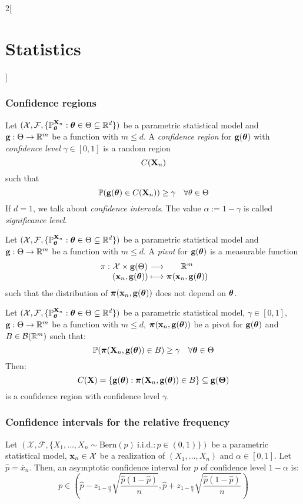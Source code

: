 \documentclass[../../../main.tex]{subfiles}
\begin{document}
\begin{multicols}{2}[\section{Statistics}]
  \subsubsection{Confidence regions}
  \begin{definition}
    Let $(\mathcal{X},\mathcal{F},\{\mathbb{P}_{\boldsymbol{\mathrm{\theta}}}^{\boldsymbol{\mathrm{X}}_n}:\boldsymbol{\mathrm{\theta}}\in\Theta\subseteq\mathbb{R}^d\})$ be a parametric statistical model and $\boldsymbol{\mathrm{g}}:\Theta\rightarrow\mathbb{R}^m$ be a function with $m\leq d$. A \emph{confidence region} for $\boldsymbol{\mathrm{g}}(\boldsymbol{\mathrm{\theta}})$ with \emph{confidence level} $\gamma\in[0,1]$ is a random region $$C(\boldsymbol{\mathrm{X}}_n)$$ such that $$\mathbb{P}(\boldsymbol{\mathrm{g}}(\boldsymbol{\mathrm{\theta}})\in C(\boldsymbol{\mathrm{X}}_n))\geq \gamma\quad\forall \theta\in\Theta$$ If $d=1$, we talk about \emph{confidence intervals}. The value $\alpha:=1-\gamma$ is called \emph{significance level}.
  \end{definition}
  \begin{definition}
    Let $(\mathcal{X},\mathcal{F},\{\mathbb{P}_{\boldsymbol{\mathrm{\theta}}}^{\boldsymbol{\mathrm{X}}_n}:\boldsymbol{\mathrm{\theta}}\in\Theta\subseteq\mathbb{R}^d\})$ be a parametric statistical model and $\boldsymbol{\mathrm{g}}:\Theta\rightarrow\mathbb{R}^m$ be a function with $m\leq d$. A \emph{pivot} for $\boldsymbol{\mathrm{g}}(\boldsymbol{\mathrm{\theta}})$ is a measurable function
    $$\function{\pi}{\mathcal{X}\times \vf{g}(\Theta)}{\RR^m}{(\vf{x}_n,\vf{g}(\vf\theta))}{\vf\pi(\vf{x}_n,\vf{g}(\vf\theta))}$$
    such that the distribution of $\boldsymbol{\mathrm{\pi}}(\boldsymbol{\mathrm{x}}_n,\boldsymbol{\mathrm{g}}(\boldsymbol{\mathrm{\theta}}))$ does not depend on $\boldsymbol{\mathrm{\theta}}$.
  \end{definition}
  \begin{proposition}
    Let $(\mathcal{X},\mathcal{F},\{\mathbb{P}_{\boldsymbol{\mathrm{\theta}}}^{\boldsymbol{\mathrm{X}}_n}:\boldsymbol{\mathrm{\theta}}\in\Theta\subseteq\mathbb{R}^d\})$ be a parametric statistical model, $\gamma\in[0,1]$, $\boldsymbol{\mathrm{g}}:\Theta\rightarrow\mathbb{R}^m$ be a function with $m\leq d$, $\boldsymbol{\mathrm{\pi}}(\boldsymbol{\mathrm{x}}_n,\boldsymbol{\mathrm{g}}(\boldsymbol{\mathrm{\theta}}))$ be a pivot for $\boldsymbol{\mathrm{g}}(\boldsymbol{\mathrm{\theta}})$ and $B\in\mathcal{B}(\mathbb{R}^m)$ such that: $$\mathbb{P}(\boldsymbol{\mathrm{\pi}}(\boldsymbol{\mathrm{X}}_n,\boldsymbol{\mathrm{g}}(\boldsymbol{\mathrm{\theta}}))\in B)\geq \gamma\quad\forall \boldsymbol{\mathrm{\theta}}\in\Theta$$
    Then: $$C(\boldsymbol{\mathrm{X}})=\{\boldsymbol{\mathrm{g}}(\boldsymbol{\mathrm{\theta}}):\boldsymbol{\mathrm{\pi}}(\boldsymbol{\mathrm{X}}_n,\boldsymbol{\mathrm{g}}(\boldsymbol{\mathrm{\theta}}))\in B\}\subseteq \boldsymbol{\mathrm{g}}(\boldsymbol{\mathrm{\Theta}})$$
    is a confidence region with confidence level $\gamma$.
  \end{proposition}
  \subsubsection{Confidence intervals for the relative frequency}
  \begin{proposition}
    Let $(\mathcal{X},\mathcal{F},\{X_1,\ldots,X_n\sim\text{Bern}(p)\ \text{i.i.d.}:p\in(0,1)\})$ be a parametric statistical model, $\boldsymbol{\mathrm{x}}_n\in\mathcal{X}$ be a realization of $(X_1,\ldots,X_n)$ and $\alpha\in[0,1]$. Let $\hat{p}=\overline{x}_n$. Then, an asymptotic confidence interval for $p$ of confidence level $1-\alpha$ is:
    $$p\in\left(\hat{p}-z_{1-\frac{\alpha}{2}}\sqrt{\frac{\hat{p}(1-\hat{p})}{n}},\hat{p}+z_{1-\frac{\alpha}{2}}\sqrt{\frac{\hat{p}(1-\hat{p})}{n}}\right)$$
  \end{proposition}

\end{multicols}
\end{document}
